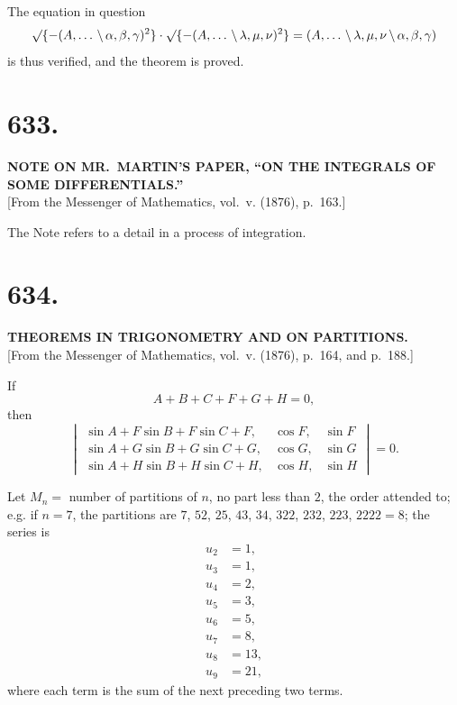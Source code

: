 \documentclass[11pt,a4paper]{book}
\begin{document}
The equation in question
\[
\surd\{-(A, \ldots \,\backslash\, \alpha, \beta, \gamma)^2\} \cdot \surd\{-(A, \ldots \,\backslash\, \lambda, \mu, \nu)^2\} = (A, \ldots \,\backslash\, \lambda, \mu, \nu \,\backslash\, \alpha, \beta, \gamma)
\]
is thus verified, and the theorem is proved.

\clearpage
\setcounter{page}{15}

\section*{633.}

\begin{center}
\textbf{NOTE ON MR.~MARTIN'S PAPER, ``ON THE INTEGRALS OF SOME DIFFERENTIALS.''}\\[1em]
[From the Messenger of Mathematics, vol.~v. (1876), p.~163.]
\end{center}

The Note refers to a detail in a process of integration.

\clearpage
\setcounter{page}{16}

\section*{634.}

\begin{center}
\textbf{THEOREMS IN TRIGONOMETRY AND ON PARTITIONS.}\\[1em]
[From the Messenger of Mathematics, vol.~v. (1876), p.~164, and p.~188.]
\end{center}

If
\[
A + B + C + F + G + H = 0,
\]
then
\[
\begin{vmatrix}
\sin A + F\sin B + F\sin C + F, & \cos F, & \sin F \\
\sin A + G\sin B + G\sin C + G, & \cos G, & \sin G \\
\sin A + H\sin B + H\sin C + H, & \cos H, & \sin H
\end{vmatrix} = 0.
\]

Let $M_n = $ number of partitions of $n$, no part less than $2$, the order attended to; e.g. if $n=7$, the partitions are $7$, $52$, $25$, $43$, $34$, $322$, $232$, $223$, $2222 = 8$; the series is
\begin{align*}
u_2 &= 1, \\
u_3 &= 1, \\
u_4 &= 2, \\
u_5 &= 3, \\
u_6 &= 5, \\
u_7 &= 8, \\
u_8 &= 13, \\
u_9 &= 21,
\end{align*}
where each term is the sum of the next preceding two terms.
\end{document}
